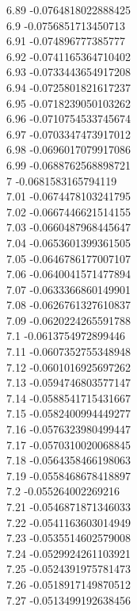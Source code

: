 {6.89	-0.0764818022888425\\
6.9	-0.0756851713450713\\
6.91	-0.074896777385777\\
6.92	-0.0741165364710402\\
6.93	-0.0733443654917208\\
6.94	-0.0725801821617237\\
6.95	-0.0718239050103262\\
6.96	-0.0710754533745674\\
6.97	-0.0703347473917012\\
6.98	-0.0696017079917086\\
6.99	-0.0688762568898721\\
7	-0.0681583165794119\\
7.01	-0.0674478103241795\\
7.02	-0.0667446621514155\\
7.03	-0.0660487968445647\\
7.04	-0.0653601399361505\\
7.05	-0.0646786177007107\\
7.06	-0.0640041571477894\\
7.07	-0.0633366860149901\\
7.08	-0.0626761327610837\\
7.09	-0.0620224265591788\\
7.1	-0.0613754972899446\\
7.11	-0.0607352755348948\\
7.12	-0.0601016925697262\\
7.13	-0.0594746803577147\\
7.14	-0.0588541715431667\\
7.15	-0.0582400994449277\\
7.16	-0.0576323980499447\\
7.17	-0.0570310020068845\\
7.18	-0.0564358466198063\\
7.19	-0.0558468678418897\\
7.2	-0.055264002269216\\
7.21	-0.0546871871346033\\
7.22	-0.0541163603014949\\
7.23	-0.0535514602579008\\
7.24	-0.0529924261103921\\
7.25	-0.0524391975781473\\
7.26	-0.0518917149870512\\
7.27	-0.0513499192638456\\
}
